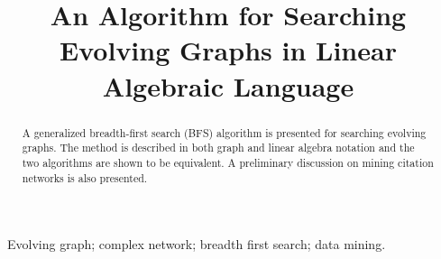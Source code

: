 \documentclass[11pt, conference, , compsocconf]{IEEEtran}
\theoremstyle{definition}
\begin{document}
%
\title{An Algorithm for Searching Evolving Graphs in Linear Algebraic Language}


\author{
\and
{}
}
 
\maketitle

\begin{abstract}
A generalized breadth-first search (BFS) algorithm is presented for 
searching evolving graphs. 
The method is described in both graph and linear algebra notation and 
the two algorithms are shown to be equivalent. 
A preliminary discussion on mining citation networks is also presented.
\end{abstract}

\begin{IEEEkeywords}
~Evolving graph; complex network; breadth first search; data mining.
\end{IEEEkeywords}

%
\IEEEpeerreviewmaketitle
\end{document}

